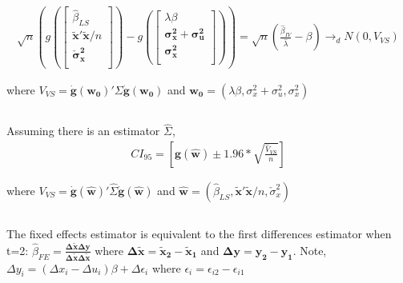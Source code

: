 \documentclass[12pt]{article}
\begin{document}
\begin{equation}
\begin{split}
  \sqrt{n} \left( g \left(
\begin{bmatrix}
\hat{\beta}_{LS} \\
\mathbf{\tilde{x}'\tilde{x}}/n \\
\mathbf{\check{\sigma}_x^2} \\
\end{bmatrix}
\right)  - g \left(
\begin{bmatrix}
\lambda \beta \\
\mathbf{\sigma_x^2 + \sigma_u^2} \\
\mathbf{\sigma_x^2} \\
\end{bmatrix} \right) \right)
= \sqrt{n}\left(\frac{\hat{\beta}_{IV}}{\hat{\lambda}} - \beta\right) \rightarrow_d N(0,V_{VS})
\end{split}
\end{equation}

where $V_{VS} = \mathbf{\dot{g}(w_0)}' \Sigma \mathbf{\dot{g}(w_0)}$ and
$ \mathbf{w_0} = (\lambda\beta,\sigma_x^2 + \sigma_u^2,\sigma_x^2)$

\subsection{}

Assuming there is an estimator $\hat{\Sigma}$,
\begin{equation}
\begin{split}
  CI_{95} = \left[\mathbf{g(\hat{w})} \pm 1.96 * \sqrt{\frac{\hat{V}_{VS}}{n}}\right]
\end{split}
\end{equation}

  where $V_{VS} = \mathbf{\dot{g}(\hat{w})}' \hat{\Sigma} \mathbf{\dot{g}(\hat{w})} $
  and
  $\mathbf{\hat{w}} = (\hat{\beta}_{LS}, \mathbf{\tilde{x}'\tilde{x}}/n  ,\check{\sigma}_x^2)$


  \subsection{}


The fixed effects estimator is equivalent to the first differences estimator when t=2:
$\hat{\beta}_{FE} = \mathbf{\frac{\Delta\tilde{x}\Delta y}{\Delta\tilde{x}\Delta\tilde{x}}}$
where $\mathbf{\Delta\tilde{x} = \tilde{x}_2 - \tilde{x}_1}$ and $\mathbf{\Delta y = y_2 - y_1}$. Note,  $\Delta y_i = (\Delta x_i - \Delta u_i)\beta + \Delta\epsilon_i$ where $\epsilon_i = \epsilon_{i2} - \epsilon_{i1} $
\end{document}

